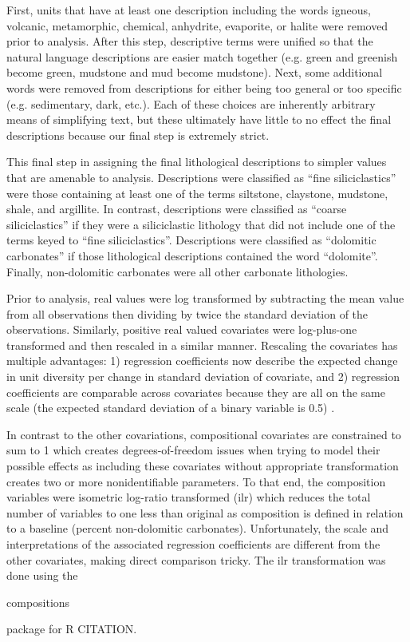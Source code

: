 \documentclass[12pt,letterpaper]{article}
\begin{document}
First, units that have at least one description including the words igneous, volcanic, metamorphic, chemical, anhydrite, evaporite, or halite were removed prior to analysis. After this step, descriptive terms were unified so that the natural language descriptions are easier match together (e.g. green and greenish become green, mudstone and mud become mudstone). Next, some additional words were removed from descriptions for either being too general or too specific (e.g. sedimentary, dark, etc.). Each of these choices are inherently arbitrary means of simplifying text, but these ultimately have little to no effect the final descriptions because our final step is extremely strict.

This final step in assigning the final lithological descriptions to simpler values that are amenable to analysis. Descriptions were classified as ``fine siliciclastics'' were those containing at least one of the terms siltstone, claystone, mudstone, shale, and argillite. In contrast, descriptions were classified as ``coarse siliciclastics'' if they were a siliciclastic lithology that did not include one of the terms keyed to ``fine siliciclastics''. Descriptions were classified as ``dolomitic carbonates'' if those lithological descriptions contained the word ``dolomite''. Finally, non-dolomitic carbonates were all other carbonate lithologies.

Prior to analysis, real values were log transformed by subtracting the mean value from all observations then dividing by twice the standard deviation of the observations. Similarly, positive real valued covariates were log-plus-one transformed and then rescaled in a similar manner. Rescaling the covariates has multiple advantages: 1) regression coefficients now describe the expected change in unit diversity per change in standard deviation of covariate, and 2) regression coefficients are comparable across covariates because they are all on the same scale (the expected standard deviation of a binary variable is 0.5) \citep{Gelman2007}. 

In contrast to the other covariations, compositional covariates are constrained to sum to 1 which creates degrees-of-freedom issues when trying to model their possible effects as including these covariates without appropriate transformation creates two or more nonidentifiable parameters. To that end, the composition variables were isometric log-ratio transformed (ilr) \citep{Egozcue2003} which reduces the total number of variables to one less than original as composition is defined in relation to a baseline (percent non-dolomitic carbonates). Unfortunately, the scale and interpretations of the associated regression coefficients are different from the other covariates, making direct comparison tricky. The ilr transformation was done using the \begin{tt} compositions \end{tt} package for R CITATION.
\end{document}

